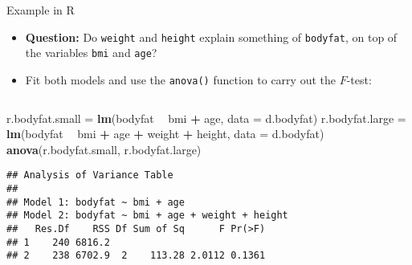\documentclass[10pt,ignorenonframetext,]{beamer}
\newenvironment{Shaded}{\begin{snugshade}}{\end{snugshade}}
\newcommand{\DataTypeTok}[1]{\textcolor[rgb]{0.13,0.29,0.53}{#1}}
\newcommand{\KeywordTok}[1]{\textcolor[rgb]{0.13,0.29,0.53}{\textbf{#1}}}
\newcommand{\NormalTok}[1]{#1}
\newcommand{\OperatorTok}[1]{\textcolor[rgb]{0.81,0.36,0.00}{\textbf{#1}}}
\newcommand{\StringTok}[1]{\textcolor[rgb]{0.31,0.60,0.02}{#1}}
\begin{document}
\begin{frame}[fragile]

\begin{block}{Example in R}

\vspace{3mm}

\begin{itemize}
\item
  \textbf{Question:} Do \texttt{weight} and \texttt{height} explain
  something of \texttt{bodyfat}, on top of the variables \texttt{bmi}
  and \texttt{age}?
\item
  Fit both models and use the \texttt{anova()} function to carry out the
  \(F\)-test:
\end{itemize}

\(~\)

\footnotesize

\begin{Shaded}
\begin{Highlighting}[]
\NormalTok{r.bodyfat.small =}\StringTok{ }\KeywordTok{lm}\NormalTok{(bodyfat }\OperatorTok{~}\StringTok{ }\NormalTok{bmi }\OperatorTok{+}\StringTok{ }\NormalTok{age, }\DataTypeTok{data =}\NormalTok{ d.bodyfat)}
\NormalTok{r.bodyfat.large =}\StringTok{ }\KeywordTok{lm}\NormalTok{(bodyfat }\OperatorTok{~}\StringTok{ }\NormalTok{bmi }\OperatorTok{+}\StringTok{ }\NormalTok{age }\OperatorTok{+}\StringTok{ }\NormalTok{weight }\OperatorTok{+}\StringTok{ }\NormalTok{height, }\DataTypeTok{data =}\NormalTok{ d.bodyfat)}
\KeywordTok{anova}\NormalTok{(r.bodyfat.small, r.bodyfat.large)}
\end{Highlighting}
\end{Shaded}

\begin{verbatim}
## Analysis of Variance Table
## 
## Model 1: bodyfat ~ bmi + age
## Model 2: bodyfat ~ bmi + age + weight + height
##   Res.Df    RSS Df Sum of Sq      F Pr(>F)
## 1    240 6816.2                           
## 2    238 6702.9  2    113.28 2.0112 0.1361
\end{verbatim}

\normalsize

\end{block}

\end{frame}
\end{document}
